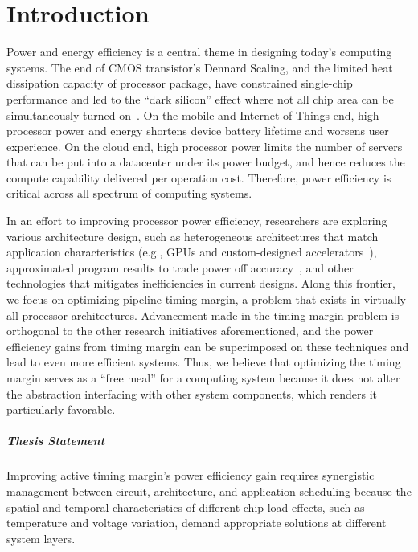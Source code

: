 
\chapter{Introduction}
\label{sec:intro}

Power and energy efficiency is a central theme in designing today's computing systems. The end of CMOS transistor's Dennard Scaling, and the limited heat dissipation capacity of processor package, have constrained single-chip performance and led to the ``dark silicon'' effect where not all chip area can be simultaneously turned on~\cite{esmaeilzadeh2011dark}. On the mobile and Internet-of-Things end, high processor power and energy shortens device battery lifetime and worsens user experience. On the cloud end, high processor power limits the number of servers that can be put into a datacenter under its power budget, and hence reduces the compute capability delivered per operation cost. Therefore, power efficiency is critical across all spectrum of computing systems. 

In an effort to improving processor power efficiency, researchers are exploring various architecture design, such as heterogeneous architectures that match application characteristics (e.g., GPUs and custom-designed accelerators~\cite{nickolls2010gpu, chen2014diannao}), approximated program results to trade power off accuracy~\cite{sampsonenerj}, and other technologies that mitigates inefficiencies in current designs. Along this frontier, we focus on optimizing pipeline timing margin, a problem that exists in virtually all processor architectures. Advancement made in the timing margin problem is orthogonal to the other research initiatives aforementioned, and the power efficiency gains from timing margin can be superimposed on these techniques and lead to even more efficient systems. Thus, we believe that optimizing the timing margin serves as a ``free meal'' for a computing system because it does not alter the abstraction interfacing with other system components, which renders it particularly favorable.

\paragraph{Thesis Statement} Improving active timing margin’s power efficiency gain requires synergistic management between circuit, architecture, and application scheduling because the spatial and temporal characteristics of different chip load effects, such as temperature and voltage variation, demand appropriate solutions at different system layers.

